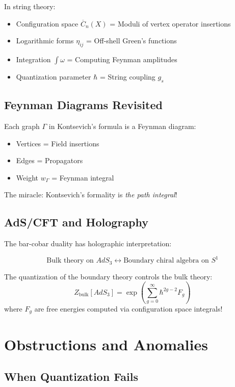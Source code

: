 In string theory:
\begin{itemize}
\item Configuration space $\overline{C}_n(X)$ = Moduli of vertex operator insertions
\item Logarithmic forms $\eta_{ij}$ = Off-shell Green's functions
\item Integration $\int \omega$ = Computing Feynman amplitudes
\item Quantization parameter $\hbar$ = String coupling $g_s$
\end{itemize}

\subsection{Feynman Diagrams Revisited}

Each graph $\Gamma$ in Kontsevich's formula is a Feynman diagram:
\begin{itemize}
\item Vertices = Field insertions
\item Edges = Propagators
\item Weight $w_\Gamma$ = Feynman integral
\end{itemize}

The miracle: Kontsevich's formality is \emph{the path integral}!

\subsection{AdS/CFT and Holography}

The bar-cobar duality has holographic interpretation:

\begin{theorem}
$$\text{Bulk theory on } AdS_3 \longleftrightarrow \text{Boundary chiral algebra on } S^1$$

The quantization of the boundary theory controls the bulk theory:
$$Z_{\text{bulk}}[AdS_3] = \exp\left(\sum_{g=0}^\infty \hbar^{2g-2} F_g\right)$$
where $F_g$ are free energies computed via configuration space integrals!
\end{theorem}

\section{Obstructions and Anomalies}

\subsection{When Quantization Fails}

